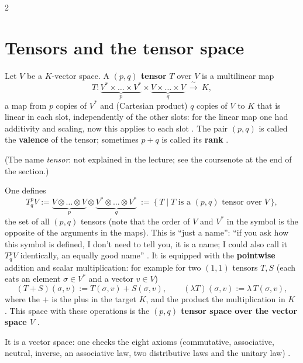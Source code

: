 \begin{paracol}{2}
\section{Tensors and the tensor space}\label{sec:te-tensors}

\begin{definition}\label{def:te-tensor}
Let $V$ be a $K$-vector space. A \textbf{$(p,q)$ tensor} $T$ over $V$ is a multilinear map
\[
  T\colon \underbrace{V^*\times\dots\times V^*}_{p}\times\underbrace{V\times\dots\times V}_{q}\ \xrightarrow{\ \sim\ }\ K,
\]
a map from $p$ copies of $V^*$ and (Cartesian product) $q$ copies of $V$ to $K$ that is linear in each slot, independently of the other slots: for the linear map one had additivity and scaling, now this applies to each slot
.
The pair $(p,q)$ is called the \textbf{valence} of the tensor; sometimes $p+q$ is called its \textbf{rank} .
\end{definition}
(The name \emph{tensor}: not explained in the lecture; see the coursenote at the end of the section.)

\begin{definition}\label{def:te-tspace}
One defines
\[
  T^p_qV:=\underbrace{V\otimes\dots\otimes V}_{p}\otimes\underbrace{V^*\otimes\dots\otimes V^*}_{q}\ :=\ \{\,T\mid T\text{ is a }(p,q)\text{ tensor over }V\,\},
\]
the set of all $(p,q)$ tensors (note that the order of $V$ and $V^*$ in the symbol is the opposite of the arguments in the maps). This is ``just a name'': ``if you ask how this symbol is defined, I don't need to tell you, it is a name; I could also call it $T^p_qV$ identically, an equally good name''
.
It is equipped with the \textbf{pointwise} addition and scalar multiplication: for example for two $(1,1)$ tensors $T,S$ (each eats an element $\sigma\in V^*$ and a vector $v\in V$)
\[
  (T+S)(\sigma,v):=T(\sigma,v)+S(\sigma,v),\qquad(\lambda T)(\sigma,v):=\lambda\,T(\sigma,v),
\]
where the $+$ is the plus in the target $K$, and the product the multiplication in $K$ .
This space with these operations is the \textbf{$(p,q)$ tensor space over the vector space $V$} .
\end{definition}
It is a vector space: one checks the eight axioms (commutative, associative, neutral, inverse, an associative law, two distributive laws and the unitary law) .


\end{paracol}
